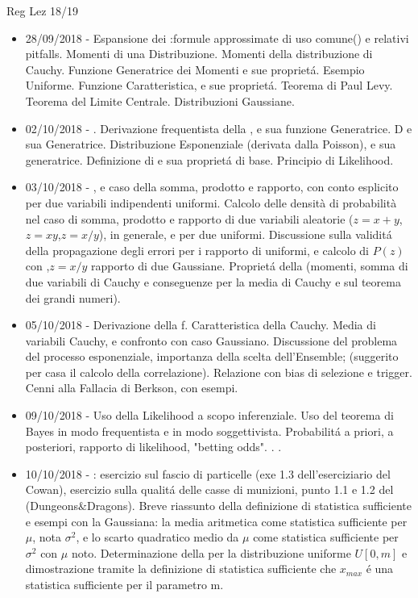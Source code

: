 \begin{frame}[allowframebreaks]{Reg Lez 18/19}
\begin{itemize}
\item 28/09/2018 - Espansione dei :formule approssimate di uso comune() e relativi pitfalls. Momenti di una Distribuzione. Momenti della distribuzione di Cauchy. Funzione Generatrice dei Momenti e sue propriet\'a. Esempio Uniforme. Funzione Caratteristica, e sue propriet\'a. Teorema di Paul Levy. Teorema del Limite Centrale. Distribuzioni Gaussiane.
\item 02/10/2018 - . Derivazione frequentista della , e sua funzione Generatrice. D e sua Generatrice. Distribuzione Esponenziale (derivata dalla Poisson), e sua generatrice. Definizione di  e sua propriet\'a di base. Principio di Likelihood.
\item 03/10/2018 - , e caso della somma, prodotto e rapporto, con conto esplicito per due variabili indipendenti uniformi. Calcolo delle densità di probabilità nel caso di somma, prodotto e rapporto di due variabili aleatorie ($z=x+y$,$z=xy$,$z=x/y$), in generale, e per due uniformi. Discussione sulla validit\'a della propagazione degli errori per i rapporto di uniformi, e calcolo di $P(z)$ con ,$z=x/y$ rapporto di due Gaussiane. Propriet\'a della  (momenti, somma di due variabili di Cauchy e conseguenze per la media di Cauchy e sul teorema dei grandi numeri).
\item 05/10/2018 - Derivazione della f. Caratteristica della Cauchy. Media di variabili Cauchy, e confronto con caso Gaussiano. Discussione del problema del processo esponenziale, importanza della scelta dell'Ensemble;  (suggerito per casa il calcolo della correlazione). Relazione con bias di selezione e trigger. Cenni alla Fallacia di Berkson, con esempi.
\item 09/10/2018 - Uso della Likelihood a scopo inferenziale. Uso del teorema di Bayes in modo frequentista e in modo soggettivista. Probabilit\'a a priori, a posteriori, rapporto di likelihood, "betting odds". . .
\item 10/10/2018 - : esercizio sul fascio di particelle (exe 1.3 dell’eserciziario del Cowan), esercizio sulla qualit\'a delle casse di munizioni, punto 1.1 e 1.2 del  (Dungeons$\&$Dragons). Breve riassunto della definizione di statistica sufficiente e esempi con la Gaussiana: la media aritmetica come statistica sufficiente per $\mu$, nota $\sigma^2$, e lo scarto quadratico medio da $\mu$ come statistica sufficiente per $\sigma^2$ con $\mu$ noto. Determinazione della  per la distribuzione uniforme $U[0,m]$ e dimostrazione tramite la definizione di statistica sufficiente che $x_{max}$ \'e una statistica sufficiente per il parametro m.

\end{itemize}
\end{frame}
